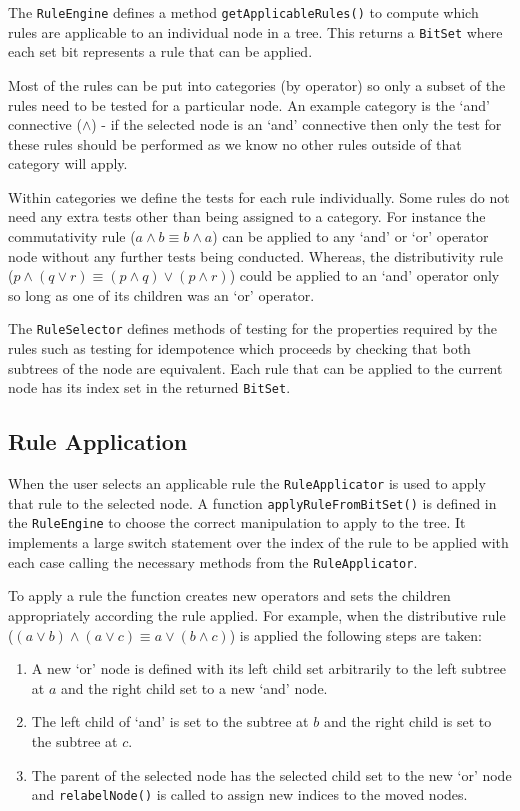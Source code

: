 \documentclass[draft]{report}
\begin{document}
The {\tt RuleEngine} defines a method {\tt getApplicableRules()} to compute which rules are applicable to an individual node in a tree. This returns a {\tt BitSet} where each set bit represents a rule that can be applied.

Most of the rules can be put into categories (by operator) so only a subset of the rules need to be tested for a particular node. An example category is the `and' connective ($\land$) - if the selected node is an `and' connective then only the test for these rules should be performed as we know no other rules outside of that category will apply.

Within categories we define the tests for each rule individually. Some rules do not need any extra tests other than being assigned to a category. For instance the commutativity rule ($a \land b \equiv b \land a$) can be applied to any `and' or `or' operator node without any further tests being conducted. Whereas, the distributivity rule ($p\land(q\lor r) \equiv (p\land q)\lor(p\land r)$) could be applied to an `and' operator only so long as one of its children was an `or' operator.

The {\tt RuleSelector} defines methods of testing for the properties required by the rules such as testing for idempotence which proceeds by checking that both subtrees of the node are equivalent. Each rule that can be applied to the current node has its index set in the returned {\tt BitSet}.

\subsection{Rule Application}
\label{sub:rule_application}

When the user selects an applicable rule the {\tt RuleApplicator} is used to apply that rule to the selected node. A function {\tt applyRuleFromBitSet()} is defined in the {\tt RuleEngine} to choose the correct manipulation to apply to the tree. It implements a large switch statement over the index of the rule to be applied with each case calling the necessary methods from the {\tt RuleApplicator}.

To apply a rule the function creates new operators and sets the children appropriately according the rule applied. For example, when the distributive rule ($(a \lor b) \land (a \lor c) \equiv a \lor (b \land c)$) is applied the following steps are taken:

\begin{enumerate}
\item A new `or' node is defined with its left child set arbitrarily to the left subtree at $a$ and the right child set to a new `and' node.
\item The left child of `and' is set to the subtree at $b$ and the right child is set to the subtree at $c$.
\item The parent of the selected node has the selected child set to the new `or' node and {\tt relabelNode()} is called to assign new indices to the moved nodes.
\end{enumerate}
\end{document}
